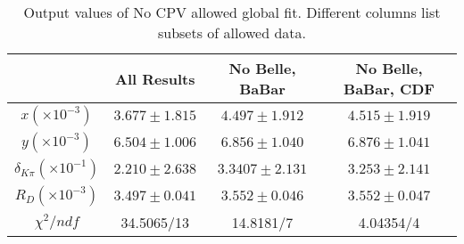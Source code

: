 \begin{table}[htdp]

\begin{center}
\begin{tabular}{|c||c||c||c|}
\hline
 & All Results & No Belle, BaBar & No Belle, BaBar, CDF \\ \hline
$x(\times10^{-3})$ & $3.677\pm 1.815$& $4.497\pm1.912$& $4.515\pm1.919$\\ \hline
$y(\times10^{-3})$ & $ 6.504\pm1.006$& $6.856\pm1.040$& $6.876\pm 1.041$\\ \hline
$\delta_{K\pi}(\times10^{-1})$ &$2.210\pm2.638$ &$3.3407\pm2.131$ & $3.253\pm2.141$\\ \hline
$R_D(\times10^{-3})$ &$3.497\pm 0.041$ & $3.552\pm 0.046$&$3.552\pm 0.047$ \\ \hline
$\chi^2/ndf$ &34.5065/13&14.8181/7 & 4.04354/4\\ \hline
\end{tabular}
\end{center}
\caption{Output values of No CPV allowed global fit. Different columns list subsets of
allowed data.}
\label{table:nocpv_output_table}
\end{table}%
